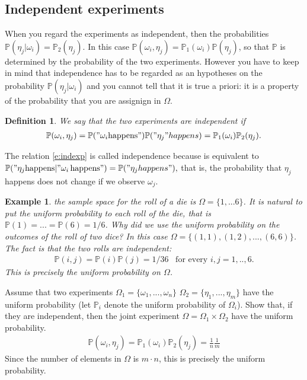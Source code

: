 \documentclass[12pt]{article}
\newtheorem{definition}[theorem]{Definition}
\newtheorem{example}[theorem]{Example}
\newcommand{\<}{{\langle \!\! \langle}}
\renewcommand{\>}{{\rangle \!\! \rangle}}
\newcommand{\bel}[2]{\begin{equation} \label{#1} \begin{split} #2
 					\end{split} \end{equation}}
\begin{document}
\subsection{Independent experiments}
When you regard the experiments as independent, then the probabilities  $\mathbb{P}(\eta_j|\omega_i)= \mathbb{P}_2(\eta_j)$.
In this case $\mathbb{P}(\omega_i,\eta_j) = \mathbb{P}_1(\omega_i)\mathbb{P}(\eta_j)$, so that $\mathbb{P}$ is determined by the probability of the two experiments.  However you have to keep in mind that independence has to be regarded as an hypotheses on the probability $\mathbb{P}(\eta_j | \omega_i) $ and you cannot tell that it is true a priori: it is a property of the probability that you are assignign in $\Omega$. 

\begin{definition}
We say that the two experiments are independent if \bel{e:indexp}{\mathbb{P}(\omega_i,\eta_j)=\mathbb{P}("\omega_i \textrm{happens}")\mathbb{P}("\eta_j" happens)=\mathbb{P}_1(\omega_i)\mathbb{P}_2(\eta_j).}
\end{definition}
The relation \eqref{e:indexp}  is called independence because is equivalent to $\mathbb{P}("\eta_j \textrm{happens} \vert "\omega_i \,\textrm{happens}")=\mathbb{P}("\eta_j happens"),$ that is, the probability that $\eta_j$ happens does not change if we observe $\omega_j$. 


\begin{example} the sample space for the roll of a die is $\Omega=\{1,...6\}$. It is natural to put the uniform probability to each roll of the die, that is $\mathbb{P}(1)=...=\mathbb{P}(6)=1/6$. Why did we use the uniform probability on the outcomes of the roll of two dice? In this case $\Omega=\{(1,1),(1,2),...,(6,6)\}$. The fact is that the two rolls are independent:
\bel{e:uniform}{\mathbb{P}(i,j)=\mathbb{P}(i)\mathbb{P}(j)=1/36\,\,\,\textrm{ for every } i,j=1,..,6.}
This is precisely the uniform probability on $\Omega$.

\end{example}

\begin{ExerciseList}
\Exercise Assume that two experiments $\Omega_1=\{\omega_1,...,\omega_n\}$ $\Omega_2=\{\eta_1,...,\eta_m\}$ have the uniform probability (let $\mathbb{P}_i$ denote the uniform probability of $\Omega_i$). Show that, if they are independent, then the joint experiment $\Omega=\Omega_1\times\Omega_2$ have the uniform probability.
\Answer  
\bel{}{\mathbb{P}(\omega_i,\eta_j)=\mathbb{P}_1(\omega_i)\mathbb{P}_2(\eta_j)=\frac{1}{n}\frac{1}{m}}
Since the number of elements in $\Omega$ is $m\cdot n$, this is precisely the uniform probability.
\end{ExerciseList}
\end{document}
